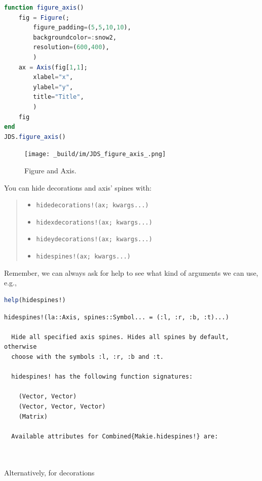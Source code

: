 \documentclass[
  notoc %
]{tufte-book}
\providecommand{\tightlist}{%
  \setlength{\itemsep}{0pt}\setlength{\parskip}{0pt}
}
\newcommand{\passthrough}[1]{#1}
\begin{document}
\begin{lstlisting}[language=Julia]
function figure_axis()
    fig = Figure(;
        figure_padding=(5,5,10,10),
        backgroundcolor=:snow2,
        resolution=(600,400),
        )
    ax = Axis(fig[1,1];
        xlabel="x",
        ylabel="y",
        title="Title",
        )
    fig
end
JDS.figure_axis()
\end{lstlisting}

\begin{figure}
\hypertarget{fig:fig_axis}{%
\centering
\texttt{[image: \_build/im/JDS\_figure\_axis\_.png]}
\caption{Figure and Axis.}\label{fig:fig_axis}
}
\end{figure}

You can hide decorations and axis' spines with:

\begin{quote}
\begin{itemize}
\tightlist
\item
  \passthrough{\lstinline"hidedecorations!(ax; kwargs...)"}
\item
  \passthrough{\lstinline"hidexdecorations!(ax; kwargs...)"}
\item
  \passthrough{\lstinline"hideydecorations!(ax; kwargs...)"}
\item
  \passthrough{\lstinline"hidespines!(ax; kwargs...)"}
\end{itemize}
\end{quote}

Remember, we can always ask for help to see what kind of arguments we
can use, e.g.,

\begin{lstlisting}[language=Julia]
help(hidespines!)
\end{lstlisting}

\begin{lstlisting}[language=Output]
  hidespines!(la::Axis, spines::Symbol... = (:l, :r, :b, :t)...)

  Hide all specified axis spines. Hides all spines by default, otherwise
  choose with the symbols :l, :r, :b and :t.

  hidespines! has the following function signatures:

    (Vector, Vector)
    (Vector, Vector, Vector)
    (Matrix)

  Available attributes for Combined{Makie.hidespines!} are:

  
\end{lstlisting}

Alternatively, for decorations
\end{document}

